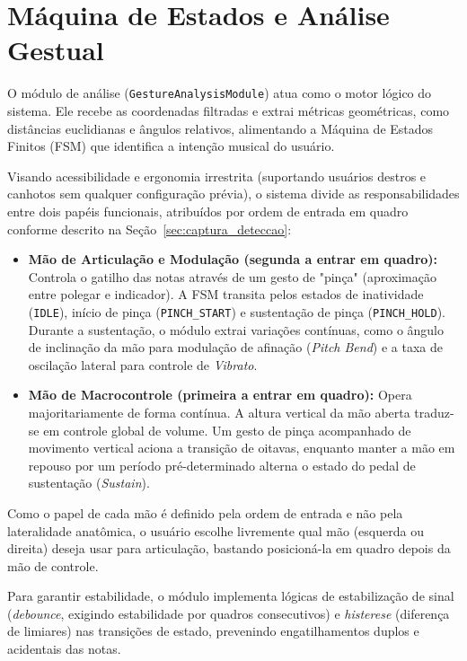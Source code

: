 \section{Máquina de Estados e Análise Gestual}
\label{sec:fsm_analise}

O módulo de análise (\texttt{GestureAnalysisModule}) atua como o motor lógico do sistema. Ele recebe as coordenadas filtradas e extrai métricas geométricas, como distâncias euclidianas e ângulos relativos, alimentando a Máquina de Estados Finitos (FSM) que identifica a intenção musical do usuário.

Visando acessibilidade e ergonomia irrestrita (suportando usuários destros e canhotos sem qualquer configuração prévia), o sistema divide as responsabilidades entre dois papéis funcionais, atribuídos por ordem de entrada em quadro conforme descrito na Seção~\ref{sec:captura_deteccao}:
\begin{itemize}
    \item \textbf{Mão de Articulação e Modulação (segunda a entrar em quadro):} Controla o gatilho das notas através de um gesto de "pinça" (aproximação entre polegar e indicador). A FSM transita pelos estados de inatividade (\texttt{IDLE}), início de pinça (\texttt{PINCH\_START}) e sustentação de pinça (\texttt{PINCH\_HOLD}). Durante a sustentação, o módulo extrai variações contínuas, como o ângulo de inclinação da mão para modulação de afinação (\textit{Pitch Bend}) e a taxa de oscilação lateral para controle de \textit{Vibrato}.
    \item \textbf{Mão de Macrocontrole (primeira a entrar em quadro):} Opera majoritariamente de forma contínua. A altura vertical da mão aberta traduz-se em controle global de volume. Um gesto de pinça acompanhado de movimento vertical aciona a transição de oitavas, enquanto manter a mão em repouso por um período pré-determinado alterna o estado do pedal de sustentação (\textit{Sustain}).
\end{itemize}

Como o papel de cada mão é definido pela ordem de entrada e não pela lateralidade anatômica, o usuário escolhe livremente qual mão (esquerda ou direita) deseja usar para articulação, bastando posicioná-la em quadro depois da mão de controle.

Para garantir estabilidade, o módulo implementa lógicas de estabilização de sinal (\textit{debounce}, exigindo estabilidade por quadros consecutivos) e \textit{histerese} (diferença de limiares) nas transições de estado, prevenindo engatilhamentos duplos e acidentais das notas.

